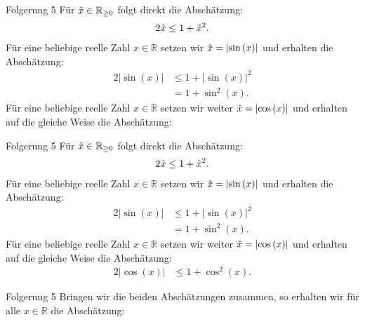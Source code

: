 \documentclass[10pt]{beamer}
\def\bR{\mathbb{R}}
\begin{document}
\begin{frame}{Folgerung 5}
    Für \( \Tilde{x} \in \bR_{\geq 0} \) folgt direkt die Abschätzung:
    \begin{align*}
        2 \Tilde{x}
        \leq 1 + \Tilde{x}^{2}.
    \end{align*}
    Für eine beliebige reelle Zahl \( x \in \bR \) setzen wir \( \Tilde{x} = \left\vert \sin\left( x \right) \right\vert \) und erhalten die Abschätzung:
    \begin{align*}
        2 \left\vert \sin\left( x \right) \right\vert
        & \leq 1 + \left\vert \sin\left( x \right) \right\vert^{2} \\
        & = 1 + \sin^{2}\left( x \right).
    \end{align*}
    Für eine beliebige reelle Zahl \( x \in \bR \) setzen wir weiter \( \Tilde{x} = \left\vert \cos\left( x \right) \right\vert \) und erhalten auf die gleiche Weise die Abschätzung:
\end{frame}



\begin{frame}{Folgerung 5}
    Für \( \Tilde{x} \in \bR_{\geq 0} \) folgt direkt die Abschätzung:
    \begin{align*}
        2 \Tilde{x}
        \leq 1 + \Tilde{x}^{2}.
    \end{align*}
    Für eine beliebige reelle Zahl \( x \in \bR \) setzen wir \( \Tilde{x} = \left\vert \sin\left( x \right) \right\vert \) und erhalten die Abschätzung:
    \begin{align*}
        2 \left\vert \sin\left( x \right) \right\vert
        & \leq 1 + \left\vert \sin\left( x \right) \right\vert^{2} \\
        & = 1 + \sin^{2}\left( x \right).
    \end{align*}
    Für eine beliebige reelle Zahl \( x \in \bR \) setzen wir weiter \( \Tilde{x} = \left\vert \cos\left( x \right) \right\vert \) und erhalten auf die gleiche Weise die Abschätzung:
    \begin{align*}
        2 \left\vert \cos\left( x \right) \right\vert
        & \leq  1 + \cos^{2}\left( x \right).
    \end{align*}
\end{frame}



\begin{frame}{Folgerung 5}
    Bringen wir die beiden Abschätzungen zusammen, so erhalten wir für alle \( x \in \bR \) die Abschätzung:
\end{frame}
\end{document}
